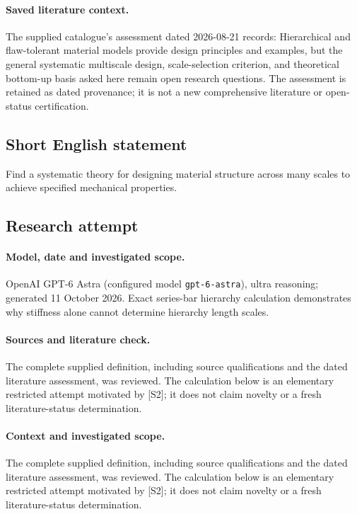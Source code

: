 \documentclass[11pt]{article}
\begin{document}
\paragraph{Saved literature context.} The supplied catalogue's assessment dated 2026-08-21 records: Hierarchical and flaw-tolerant material models provide design principles and examples, but the general systematic multiscale design, scale-selection criterion, and theoretical bottom-up basis asked here remain open research questions. The assessment is retained as dated provenance; it is not a new comprehensive literature or open-status certification.
\subsection{Short English statement}
Find a systematic theory for designing material structure across many scales to achieve specified mechanical properties.
\subsection{Research attempt}
\paragraph{Model, date and investigated scope.}
OpenAI GPT-6 Astra (configured model \texttt{gpt-6-astra}), ultra reasoning; generated 11 October 2026. Exact series-bar hierarchy calculation demonstrates why stiffness alone cannot determine hierarchy length scales.

\paragraph{Sources and literature check.}
The complete supplied definition, including source qualifications and the dated literature assessment, was reviewed. The calculation below is an elementary restricted attempt motivated by [S2]; it does not claim novelty or a fresh literature-status determination.

\paragraph{Context and investigated scope.} The complete supplied definition, including source qualifications and the dated literature assessment, was reviewed. The calculation below is an elementary restricted attempt motivated by [S2]; it does not claim novelty or a fresh literature-status determination.
\end{document}
